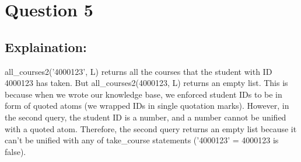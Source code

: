 \section{Question 5}

\subsection{Explaination:}

all\_courses2('4000123', L) returns all the courses that the student with ID 4000123 has taken.
But all\_courses2(4000123, L) returns an empty list.
This is because when we wrote our knowledge base, we enforced student IDs to be in form of quoted atoms (we wrapped IDs in single quotation marks).
However, in the second query, the student ID is a number, and a number cannot be unified with a
quoted atom.
Therefore, the second query returns an empty list because it can’t be unified with any of
take\_course statements ('4000123' = 4000123 is false).
